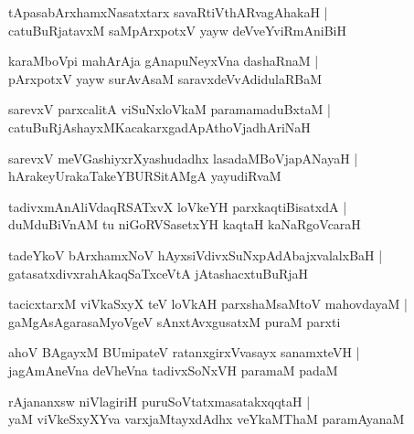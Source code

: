 \documentclass[twoside,12pt,openright]{book}
\newcounter{shloka}[chapter]
\begin{document}
\begin{shloka}%
tApasabArxhamxNasatxtarx savaRtiVthARvagAhakaH |\\
catuBuRjatavxM saMpArxpotxV yayw deVveYviRmAniBiH 
\end{shloka}

\begin{shloka}%
karaMboVpi mahArAja gAnapuNeyxVna dashaRnaM |\\
pArxpotxV yayw surAvAsaM saravxdeVvAdidulaRBaM 
\end{shloka}

\begin{shloka}%
sarevxV parxcalitA viSuNxloVkaM paramamaduBxtaM |\\
catuBuRjAshayxMKacakarxgadApAthoVjadhAriNaH
\end{shloka}

\begin{shloka}%
sarevxV meVGashiyxrXyashudadhx lasadaMBoVjapANayaH |\\
hArakeyUrakaTakeYBURSitAMgA yayudiRvaM 
\end{shloka}

\begin{shloka}%
tadivxmAnAliVdaqRSATxvX loVkeYH parxkaqtiBisatxdA |\\
duMduBiVnAM tu niGoRVSasetxYH kaqtaH kaNaRgoVcaraH
\end{shloka}

\begin{shloka}%
tadeYkoV bArxhamxNoV hAyxsiVdivxSuNxpAdAbajxvalalxBaH |\\
gatasatxdivxrahAkaqSaTxceVtA jAtashacxtuBuRjaH
\end{shloka}

\begin{shloka}%
tacicxtarxM viVkaSxyX teV loVkAH parxshaMsaMtoV mahovdayaM |\\
gaMgAsAgarasaMyoVgeV sAnxtAvxgusatxM puraM parxti
\end{shloka}

\begin{shloka}%
ahoV BAgayxM BUmipateV ratanxgirxVvasayx sanamxteVH |\\
jagAmAneVna deVheVna tadivxSoNxVH paramaM padaM
\end{shloka}

\begin{shloka}%
rAjananxsw niVlagiriH puruSoVtatxmasatakxqqtaH |\\
yaM viVkeSxyXYva varxjaMtayxdAdhx veYkaMThaM paramAyanaM 
\end{shloka}
\end{document}
